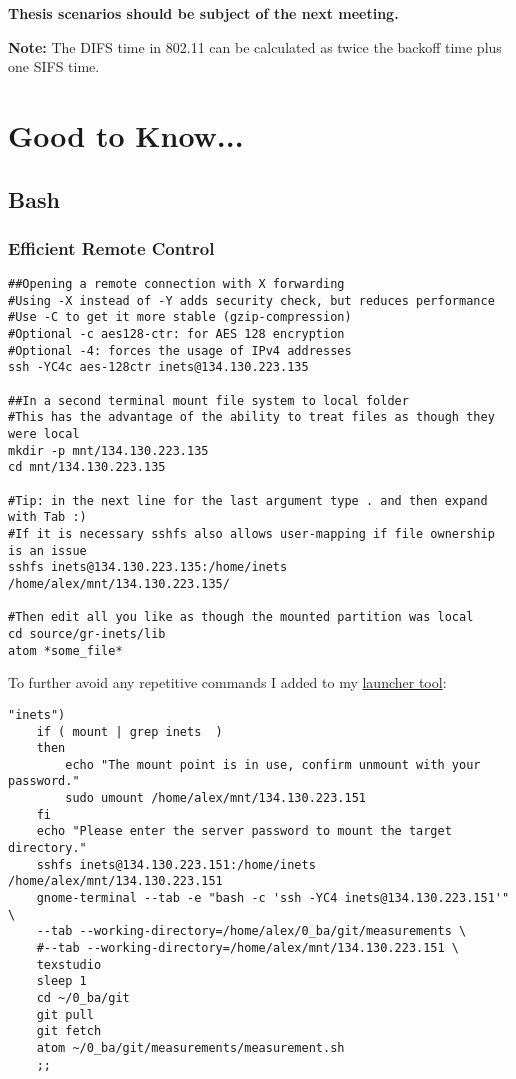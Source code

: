 \documentclass{article}
\begin{document}
\textbf{Thesis scenarios should be subject of the next meeting.}

\bigskip

\textbf{Note:} The DIFS time in 802.11 can be calculated as twice the backoff time plus one SIFS time.



\section{Good to Know...}

\subsection{Bash}

\subsubsection{Efficient Remote Control}

\begin{verbatim}
##Opening a remote connection with X forwarding
#Using -X instead of -Y adds security check, but reduces performance
#Use -C to get it more stable (gzip-compression)
#Optional -c aes128-ctr: for AES 128 encryption
#Optional -4: forces the usage of IPv4 addresses
ssh -YC4c aes-128ctr inets@134.130.223.135

##In a second terminal mount file system to local folder
#This has the advantage of the ability to treat files as though they were local
mkdir -p mnt/134.130.223.135
cd mnt/134.130.223.135

#Tip: in the next line for the last argument type . and then expand with Tab :)
#If it is necessary sshfs also allows user-mapping if file ownership is an issue
sshfs inets@134.130.223.135:/home/inets /home/alex/mnt/134.130.223.135/

#Then edit all you like as though the mounted partition was local
cd source/gr-inets/lib
atom *some_file*

\end{verbatim}

To further avoid any repetitive commands I added to my \href{http://alexander-pastor.de/convenient-linux-game-launcher/}{launcher tool}:

\begin{verbatim}
"inets")
	if ( mount | grep inets  )
	then
		echo "The mount point is in use, confirm unmount with your password."
		sudo umount /home/alex/mnt/134.130.223.151
	fi
	echo "Please enter the server password to mount the target directory."
	sshfs inets@134.130.223.151:/home/inets /home/alex/mnt/134.130.223.151
	gnome-terminal --tab -e "bash -c 'ssh -YC4 inets@134.130.223.151'" \
	--tab --working-directory=/home/alex/0_ba/git/measurements \
	#--tab --working-directory=/home/alex/mnt/134.130.223.151 \
	texstudio
	sleep 1
	cd ~/0_ba/git
	git pull
	git fetch
	atom ~/0_ba/git/measurements/measurement.sh
	;;
\end{verbatim}
\end{document}

